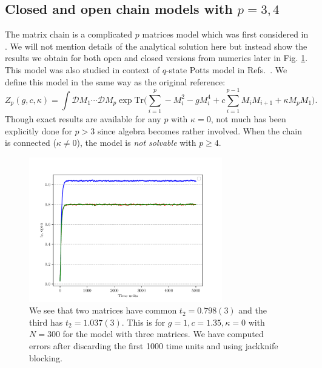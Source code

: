 \documentclass[11pt]{article}
\begin{document}
\subsection{\label{subsection:Mchain}Closed and open chain models with $p = 3, 4$}
The matrix chain is a complicated $p$ matrices model which was first considered in \cite{Chadha:1980ri}. We will not mention details of the analytical solution here but instead show the results we obtain for both open and closed versions from numerics later in Fig. \ref{fig:3MM_open}. This model was also studied in context 
of $q$-state Potts model in Refs.~\cite{KAZAKOV198893, KOSTOV1989295, Daul:1994qy}. We define this model in the same way as the original reference: 
\begin{equation}
	\label{eq:Mehta1} 
	Z_{p}(g,c,\kappa) = \int \mathcal{D}M_{1} \cdots  \mathcal{D}M_{p} \exp \mathrm{Tr}\Bigg(\sum_{i=1}^{p} -M_{i}^2  - g M_{i}^{4} + c \sum_{i=1}^{p-1} M_{i}M_{i+1} 
	+ \kappa M_{p}M_{1} \Bigg).
\end{equation} 
Though exact results are available for any $p$ with $\kappa=0$, not much has been explicitly done for $p > 3$ since algebra becomes rather involved. When the chain is connected ($\kappa \neq 0$), the model is \emph{not solvable} with $p \ge 4$. 
\begin{figure}[htbp] 
	\centering 
	\includegraphics[width=0.75\textwidth]{figs/3MM_open.pdf}
	\caption{\label{fig:3MM_open}We see that two matrices have common $t_{2} = 0.798(3)$ and the third has 
	$t_{2} = 1.037(3)$. This is for $g=1, c=1.35, \kappa=0$ with $N=300$ for the model with three matrices. 
	We have computed errors after discarding the first 1000 time units and using jackknife blocking.}
\end{figure}
\end{document}
